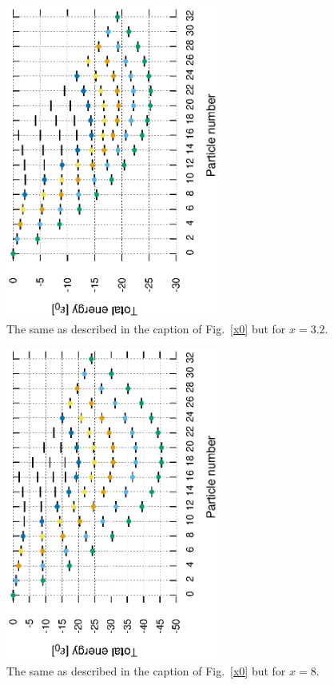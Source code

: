 \documentclass[11pt]{book} %
\begin{document}
\begin{figure}[htbp]
 \begin{center}
  \includegraphics[width=70mm,angle=-90]{images/spectra_x3p2.eps}
 \end{center}
 \caption{The same as described in the caption of Fig.~\ref{x0} but for $x=3.2$.
	}
 \label{x3p2}
\end{figure}

\begin{figure}[htbp]
 \begin{center}
  \includegraphics[width=70mm,angle=-90]{images/spectra_x8.eps}
 \end{center}
 \caption{The same as described in the caption of Fig.~\ref{x0} but for $x=8$.
	}
 \label{x8}
\end{figure}
\end{document}
